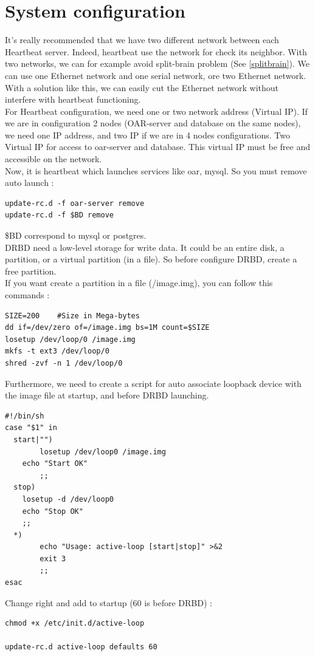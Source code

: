 \documentclass[a4paper,10pt]{report}
\begin{document}
\section{System configuration}
It's really recommended that we have two different network between each Heartbeat server. Indeed, heartbeat use the network for check its neighbor. With two networks, we can for example avoid split-brain problem (See \ref{splitbrain}). We can use one Ethernet network and one serial network, ore two Ethernet network. With a solution like this, we can easily cut the Ethernet network without interfere with heartbeat functioning.\\
For Heartbeat configuration, we need one or two network address (Virtual IP). If we are in configuration 2 nodes (OAR-server and database on the same nodes), we need one IP address, and two IP if we are in 4 nodes configurations. Two Virtual IP for access to oar-server and database. This virtual IP must be free and accessible on the network.\\

Now, it is heartbeat which launches services like oar, mysql. So you must remove auto launch :
\begin{lstlisting}
update-rc.d -f oar-server remove
update-rc.d -f $BD remove
\end{lstlisting}
\$BD correspond to mysql or postgres.\\

DRBD need a low-level storage for write data. It could be an entire disk, a partition, or a virtual partition (in a file). So before configure DRBD, create a free partition.\\
If you want create a partition in a file (/image.img), you can follow this commands :
\begin{lstlisting}
SIZE=200	#Size in Mega-bytes
dd if=/dev/zero of=/image.img bs=1M count=$SIZE
losetup /dev/loop/0 /image.img
mkfs -t ext3 /dev/loop/0
shred -zvf -n 1 /dev/loop/0	
\end{lstlisting}
Furthermore, we need to create a script for auto associate loopback device with the image file at startup, and before DRBD launching.
\begin{lstlisting}
#!/bin/sh
case "$1" in
  start|"") 
        losetup /dev/loop0 /image.img
	echo "Start OK"
        ;;
  stop)
	losetup -d /dev/loop0
	echo "Stop OK"
	;;
  *)
        echo "Usage: active-loop [start|stop]" >&2
        exit 3
        ;;
esac
\end{lstlisting}
Change right and add to startup (60 is before DRBD) :
\begin{lstlisting}
chmod +x /etc/init.d/active-loop

update-rc.d active-loop defaults 60
\end{lstlisting}
\end{document}
